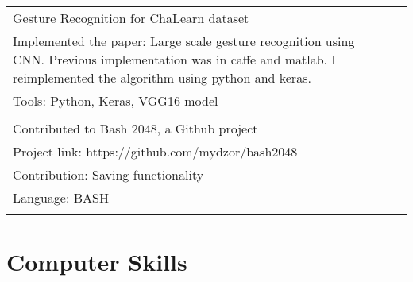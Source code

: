 \documentclass[a4paper,10pt]{article} %
\begin{document}
\begin{tabular}{p{15cm}p{9cm}}
        \textsf{Gesture Recognition for ChaLearn dataset} &  \\
        \textsf{Implemented the paper: Large scale gesture recognition using
        CNN. Previous implementation was in caffe and matlab. I reimplemented
        the algorithm using python and keras.}                  & \\
        \textsf{Tools: Python, Keras, VGG16 model}                                                 & \\
                                                                              & \\

        \textsf{Contributed to Bash 2048, a Github project} & \\
        \textsf{Project link: https://github.com/mydzor/bash2048}                  & \\
        \textsf{Contribution: Saving functionality}                  & \\
        \textsf{Language: BASH}                                                 & \\
                                                                              & \\

\end{tabular}

\section{Computer Skills}
\end{document}
